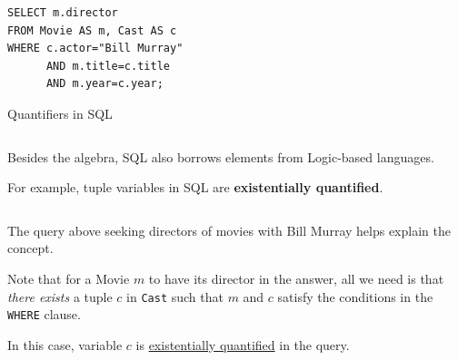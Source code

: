 \documentclass[xcolor={usenames,dvipsnames}]{beamer}
\begin{document}
%
%



%
%
%
%
\newsavebox\thereExistsExample
\begin{lrbox}{\thereExistsExample}
\begin{minipage}{0.44\textwidth}
\begin{lstlisting}[style=SQL]
SELECT m.director
FROM Movie AS m, Cast AS c
WHERE c.actor="Bill Murray"
      AND m.title=c.title
      AND m.year=c.year;
\end{lstlisting}
\end{minipage}
\end{lrbox}

%
%

\begin{frame}{Quantifiers in SQL}


\begin{columns}[onlytextwidth]
\begin{column}{0.65\textwidth}
Besides the algebra, SQL also borrows elements from Logic-based languages.

For example, tuple variables in SQL are \textbf{existentially quantified}.
\end{column}
\begin{column}{0.35\textwidth}
\scalebox{0.75}{\fbox{\usebox{\thereExistsExample}}}
\end{column}
\end{columns}

The query above seeking directors of movies with Bill Murray helps explain the concept.

Note that for a Movie $m$ to have its director in the answer, all we need is that \alert{\emph{there exists} a tuple $c$} in \lstinline[style=SQL]{Cast} such that $m$ and $c$ satisfy the conditions in the \lstinline[style=SQL]{WHERE} clause.

In this case, variable $c$ is \underline{existentially quantified} in the query.

\end{frame}

%
%
\end{document}
